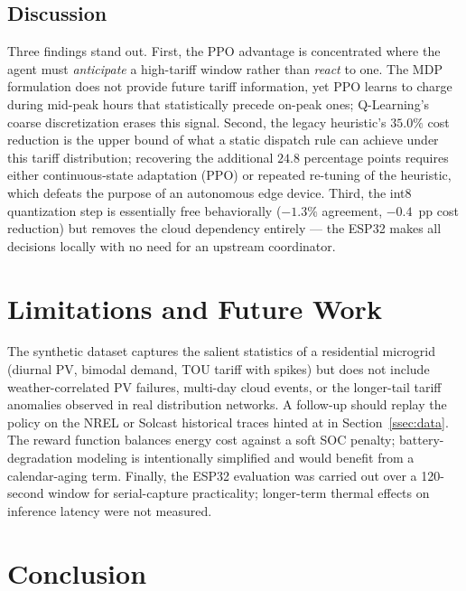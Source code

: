 \documentclass[conference]{IEEEtran}
\begin{document}
\subsection{Discussion}
\label{ssec:discussion}

Three findings stand out. First, the PPO advantage is concentrated where the agent must \textit{anticipate} a high-tariff window rather than \textit{react} to one. The MDP formulation does not provide future tariff information, yet PPO learns to charge during mid-peak hours that statistically precede on-peak ones; Q-Learning's coarse discretization erases this signal. Second, the legacy heuristic's $35.0\%$ cost reduction is the upper bound of what a static dispatch rule can achieve under this tariff distribution; recovering the additional $24.8$ percentage points requires either continuous-state adaptation (PPO) or repeated re-tuning of the heuristic, which defeats the purpose of an autonomous edge device. Third, the int8 quantization step is essentially free behaviorally ($-1.3\%$ agreement, $-0.4$~pp cost reduction) but removes the cloud dependency entirely --- the ESP32 makes all decisions locally with no need for an upstream coordinator.

\section{Limitations and Future Work}
\label{sec:limit}

The synthetic dataset captures the salient statistics of a residential microgrid (diurnal PV, bimodal demand, TOU tariff with spikes) but does not include weather-correlated PV failures, multi-day cloud events, or the longer-tail tariff anomalies observed in real distribution networks. A follow-up should replay the policy on the NREL or Solcast historical traces hinted at in Section~\ref{ssec:data}. The reward function balances energy cost against a soft SOC penalty; battery-degradation modeling is intentionally simplified and would benefit from a calendar-aging term. Finally, the ESP32 evaluation was carried out over a 120-second window for serial-capture practicality; longer-term thermal effects on inference latency were not measured.

\section{Conclusion}
\label{sec:conclusion}
\end{document}
